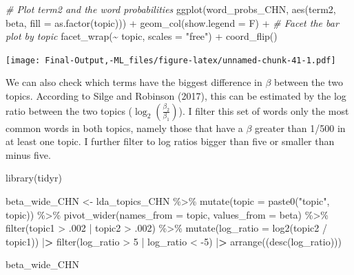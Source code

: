 \documentclass[
]{article}
\newenvironment{Shaded}{\begin{snugshade}}{\end{snugshade}}
\newcommand{\AttributeTok}[1]{\textcolor[rgb]{0.77,0.63,0.00}{#1}}
\newcommand{\CommentTok}[1]{\textcolor[rgb]{0.56,0.35,0.01}{\textit{#1}}}
\newcommand{\DecValTok}[1]{\textcolor[rgb]{0.00,0.00,0.81}{#1}}
\newcommand{\ErrorTok}[1]{\textcolor[rgb]{0.64,0.00,0.00}{\textbf{#1}}}
\newcommand{\FunctionTok}[1]{\textcolor[rgb]{0.00,0.00,0.00}{#1}}
\newcommand{\NormalTok}[1]{#1}
\newcommand{\OtherTok}[1]{\textcolor[rgb]{0.56,0.35,0.01}{#1}}
\newcommand{\SpecialCharTok}[1]{\textcolor[rgb]{0.00,0.00,0.00}{#1}}
\newcommand{\StringTok}[1]{\textcolor[rgb]{0.31,0.60,0.02}{#1}}
\begin{document}
\begin{Shaded}
\begin{Highlighting}[]
\CommentTok{\# Plot term2 and the word probabilities}
\FunctionTok{ggplot}\NormalTok{(word\_probs\_CHN, }\FunctionTok{aes}\NormalTok{(term2, beta, }\AttributeTok{fill =} \FunctionTok{as.factor}\NormalTok{(topic))) }\SpecialCharTok{+}
  \FunctionTok{geom\_col}\NormalTok{(}\AttributeTok{show.legend =}\NormalTok{ F) }\SpecialCharTok{+}
  \CommentTok{\# Facet the bar plot by topic}
  \FunctionTok{facet\_wrap}\NormalTok{(}\SpecialCharTok{\textasciitilde{}}\NormalTok{ topic, }\AttributeTok{scales =} \StringTok{"free"}\NormalTok{) }\SpecialCharTok{+}
  \FunctionTok{coord\_flip}\NormalTok{()}
\end{Highlighting}
\end{Shaded}

\texttt{[image: Final-Output,-ML\_files/figure-latex/unnamed-chunk-41-1.pdf]}

We can also check which terms have the biggest difference in \(\beta\)
between the two topics. According to Silge and Robinson (2017), this can
be estimated by the log ratio between the two topics
(\(\log_2(\frac{\beta_2}{\beta_1})\)). I filter this set of words only
the most common words in both topics, namely those that have a \(\beta\)
greater than 1/500 in at least one topic. I further filter to log ratios
bigger than five or smaller than minus five.

\begin{Shaded}
\begin{Highlighting}[]
\FunctionTok{library}\NormalTok{(tidyr)}

\NormalTok{beta\_wide\_CHN }\OtherTok{\textless{}{-}}\NormalTok{ lda\_topics\_CHN }\SpecialCharTok{\%\textgreater{}\%}
  \FunctionTok{mutate}\NormalTok{(}\AttributeTok{topic =} \FunctionTok{paste0}\NormalTok{(}\StringTok{"topic"}\NormalTok{, topic)) }\SpecialCharTok{\%\textgreater{}\%}
  \FunctionTok{pivot\_wider}\NormalTok{(}\AttributeTok{names\_from =}\NormalTok{ topic, }\AttributeTok{values\_from =}\NormalTok{ beta) }\SpecialCharTok{\%\textgreater{}\%} 
  \FunctionTok{filter}\NormalTok{(topic1 }\SpecialCharTok{\textgreater{}}\NormalTok{ .}\DecValTok{002} \SpecialCharTok{|}\NormalTok{ topic2 }\SpecialCharTok{\textgreater{}}\NormalTok{ .}\DecValTok{002}\NormalTok{) }\SpecialCharTok{\%\textgreater{}\%}
  \FunctionTok{mutate}\NormalTok{(}\AttributeTok{log\_ratio =} \FunctionTok{log2}\NormalTok{(topic2 }\SpecialCharTok{/}\NormalTok{ topic1)) }\SpecialCharTok{|}\ErrorTok{\textgreater{}} 
    \FunctionTok{filter}\NormalTok{(log\_ratio }\SpecialCharTok{\textgreater{}} \DecValTok{5} \SpecialCharTok{|}\NormalTok{ log\_ratio }\SpecialCharTok{\textless{}} \SpecialCharTok{{-}}\DecValTok{5}\NormalTok{) }\SpecialCharTok{|}\ErrorTok{\textgreater{}} 
    \FunctionTok{arrange}\NormalTok{((}\FunctionTok{desc}\NormalTok{(log\_ratio)))}

\NormalTok{beta\_wide\_CHN}
\end{Highlighting}
\end{Shaded}
\end{document}
